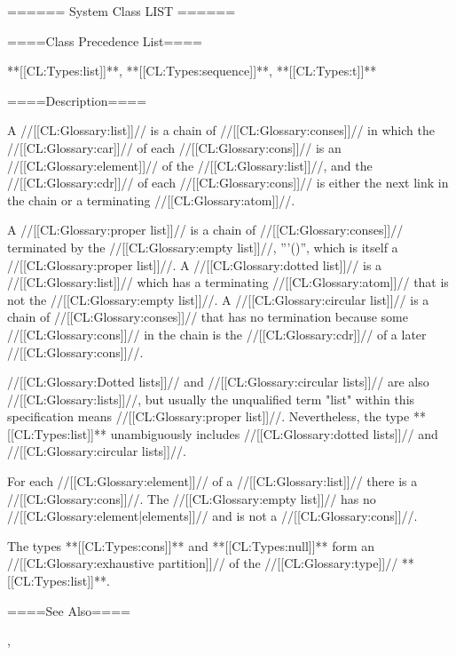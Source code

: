 ====== System Class LIST ======

====Class Precedence List====

**[[CL:Types:list]]**, **[[CL:Types:sequence]]**, **[[CL:Types:t]]**

====Description====

A //[[CL:Glossary:list]]// is a chain of //[[CL:Glossary:conses]]// in which the //[[CL:Glossary:car]]// of each //[[CL:Glossary:cons]]// is an //[[CL:Glossary:element]]// of the //[[CL:Glossary:list]]//, and the //[[CL:Glossary:cdr]]// of each //[[CL:Glossary:cons]]// is either the next link in the chain or a terminating //[[CL:Glossary:atom]]//.

A //[[CL:Glossary:proper list]]// is a chain of //[[CL:Glossary:conses]]// terminated by the //[[CL:Glossary:empty list]]//, '''()'', which is itself a //[[CL:Glossary:proper list]]//. A //[[CL:Glossary:dotted list]]// is a //[[CL:Glossary:list]]// which has a terminating //[[CL:Glossary:atom]]// that is not the //[[CL:Glossary:empty list]]//. A //[[CL:Glossary:circular list]]// is a chain of //[[CL:Glossary:conses]]// that has no termination because some //[[CL:Glossary:cons]]// in the chain is the //[[CL:Glossary:cdr]]// of a later //[[CL:Glossary:cons]]//.

//[[CL:Glossary:Dotted lists]]// and //[[CL:Glossary:circular lists]]// are also //[[CL:Glossary:lists]]//, but usually the unqualified term "list" within this specification means //[[CL:Glossary:proper list]]//. Nevertheless, the type **[[CL:Types:list]]** unambiguously includes //[[CL:Glossary:dotted lists]]// and //[[CL:Glossary:circular lists]]//.

For each //[[CL:Glossary:element]]// of a //[[CL:Glossary:list]]// there is a //[[CL:Glossary:cons]]//. The //[[CL:Glossary:empty list]]// has no //[[CL:Glossary:element|elements]]// and is not a //[[CL:Glossary:cons]]//.

The types **[[CL:Types:cons]]** and **[[CL:Types:null]]** form an //[[CL:Glossary:exhaustive partition]]// of the //[[CL:Glossary:type]]// **[[CL:Types:list]]**.

====See Also====

{\secref\LeftParen}, {\secref\PrintingListsAndConses}

